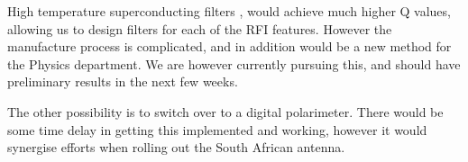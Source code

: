 High temperature superconducting filters \cite{splitRingHTS}, would achieve much higher Q values, allowing us to design filters for each of the RFI features. However the manufacture process is complicated, and in addition would be a new method for the Physics department. We are however currently pursuing this, and should have preliminary results in the next few weeks.

The other possibility is to switch over to a digital polarimeter. There would be some time delay in getting this implemented and working, however it would synergise efforts when rolling out the South African antenna. 













\clearpage